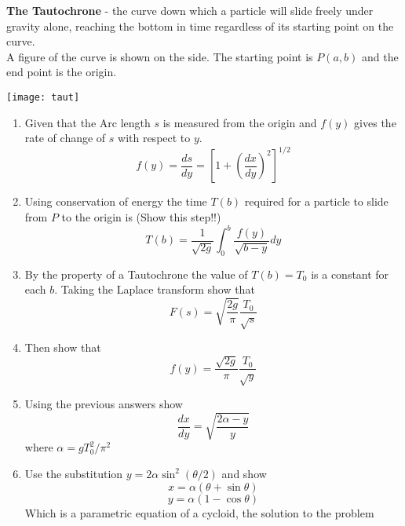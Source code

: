\begin{multicols*}{2}
	\begin{q}
		\textbf{The Tautochrone} - the curve down which a particle will slide freely under gravity alone, reaching the bottom in time regardless of its starting point on the curve. \\
		A figure of the curve is shown on the side. The starting point is $ P(a,b) $ and the end point is the origin. \\ 
		\begin{center}
			\texttt{[image: taut]} 
		\end{center}
		\begin{enumerate}
			\item Given that the Arc length $ s $ is measured from the origin and $ f(y) $ gives the rate of change of $ s $ with respect to $ y $. 
			\[ f(y) = \dfrac{ds}{dy} = \left[1 + \left( \dfrac{dx}{dy} \right)^2 \right]^{1/2} \]
			\item Using conservation of energy the time $ T(b) $ required for a particle to slide from $ P $ to the origin is (Show this step!!)
			\[ T(b) = \dfrac{1}{\sqrt{2g}} \int_{0}^{b}\dfrac{f(y)}{\sqrt{b-y}} dy\]
			\item By the property of a Tautochrone the value of $ T(b) = T_0 $ is a constant for each $ b $. Taking the Laplace transform show that 
			\[ F(s) = \sqrt{\dfrac{2g}{\pi}} \dfrac{T_0}{\sqrt{s}} \] 
			\item Then show that 
			\[ f(y) = \dfrac{\sqrt{2g}}{\pi} \dfrac{T_0}{\sqrt{y}}\] 
			\item Using the previous answers show 
			\[ \dfrac{dx}{dy} = \sqrt{\dfrac{2 \alpha - y}{y}} \]
			where $ \alpha = gT_0^2/\pi^2 $ 
			\item Use the substitution $ y = 2 \alpha \sin ^2 (\theta / 2)$ and show 
			\[ x = \alpha (\theta + \sin \theta) \] \[ y = \alpha (1-\cos \theta)\] 
			Which is a parametric equation of a cycloid, the solution to the problem
		\end{enumerate}
	\end{q}
\end{multicols*}